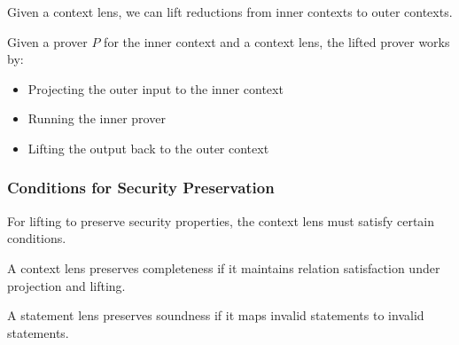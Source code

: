 Given a context lens, we can lift reductions from inner contexts to outer contexts.

\begin{definition}
    \label{def:prover_lift_context}
    Given a prover $P$ for the inner context and a context lens, the lifted prover works by:
    \begin{itemize}
        \item Projecting the outer input to the inner context
        \item Running the inner prover
        \item Lifting the output back to the outer context
    \end{itemize}
\end{definition}

\begin{definition}
    \label{def:verifier_lift_context}
\end{definition}

\begin{definition}
    \label{def:reduction_lift_context}
\end{definition}

\subsubsection{Conditions for Security Preservation}

For lifting to preserve security properties, the context lens must satisfy certain conditions.

\begin{definition}
    \label{def:context_lens_is_complete}
    A context lens preserves completeness if it maintains relation satisfaction under projection and lifting.
\end{definition}

\begin{definition}
    \label{def:statement_lens_is_sound}
    A statement lens preserves soundness if it maps invalid statements to invalid statements.
\end{definition}

